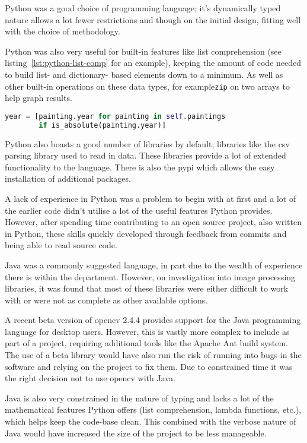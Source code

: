 Python was a good choice of programming language; it's dynamically typed nature allows a lot fewer
restrictions and though on the initial design, fitting well with the choice of methodology. 

Python was also very useful for built-in features like list comprehension (see 
listing~\ref{lst:python-list-comp} for an example), keeping the amount of code needed to build 
list- and dictionary- based elements down to a minimum. As well as other built-in operations on 
these data types, for example\texttt{zip} on two arrays to help graph results.

\begin{lstlisting}[language=python,
caption={Example of List Comprehension in Python},
label=lst:python-list-comp]
year = [painting.year for painting in self.paintings 
        if is_absolute(painting.year)]
\end{lstlisting}

Python also boasts a good number of libraries by default; libraries like the \gls{csv} parsing 
library used to read in data. These libraries provide a lot of extended functionality to the 
language. There is also the \gls{pypi} which allows the easy installation of 
additional packages.

A lack of experience in Python was a problem to begin with at first and a lot of the earlier code 
didn't utilise a lot of the useful features Python provides. However, after spending time 
contributing to an open source project, also written in Python, these skills quickly developed 
through feedback from commits and being able to read source code.

Java was a commonly suggested language, in part due to the wealth of experience there is within
the department. However, on investigation into image processing libraries, it was found that most
of these libraries were either difficult to work with or were not as complete as other available
options.

A recent beta version of \gls{opencv} 2.4.4 provides support for the Java programming language
for desktop users. However, this is vastly more complex to include as part of a project, requiring
additional tools like the Apache Ant build system. The use of a beta library would have also run the 
risk of running into bugs in the software and relying on the project to fix them. Due to constrained time it was the right decision not to
use \gls{opencv} with Java.

Java is also very constrained in the nature of typing and lacks a lot of the mathematical features
Python offers (list comprehension, lambda functions, etc.), which helps keep the code-base clean.
This combined with the verbose nature of Java would have increased the size of the project to
be less manageable.

